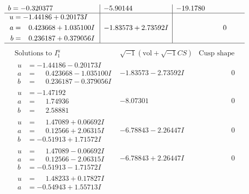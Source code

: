\documentclass[1p]{elsarticle_modified}
\theoremstyle{definition}
\newcommand{\I}{\sqrt{-1}}
\begin{document}
$$\begin{array}{c|c|c}
\begin{aligned}
b &= -0.320377\phantom{ +0.000000I}\end{aligned}
 & -5.90144\phantom{ +0.000000I} & -19.1780\phantom{ +0.000000I} \\ \hline\begin{aligned}
u &= -1.44186 + 0.20173 I \\
a &= \phantom{-}0.423668 + 1.035100 I \\
b &= \phantom{-}0.236187 + 0.379056 I\end{aligned}
 & -1.83573 + 2.73592 I & \phantom{-0.000000 } 0\\
 \hline 
 \end{array}$$\newpage$$\begin{array}{c|c|c}  
\text{Solutions to }I^u_{1}& \I (\text{vol} + \sqrt{-1}CS) & \text{Cusp shape}\\
 \hline 
\begin{aligned}
u &= -1.44186 - 0.20173 I \\
a &= \phantom{-}0.423668 - 1.035100 I \\
b &= \phantom{-}0.236187 - 0.379056 I\end{aligned}
 & -1.83573 - 2.73592 I & \phantom{-0.000000 } 0 \\ \hline\begin{aligned}
u &= -1.47192\phantom{ +0.000000I} \\
a &= \phantom{-}1.74936\phantom{ +0.000000I} \\
b &= \phantom{-}2.58881\phantom{ +0.000000I}\end{aligned}
 & -8.07301\phantom{ +0.000000I} & \phantom{-0.000000 } 0 \\ \hline\begin{aligned}
u &= \phantom{-}1.47089 + 0.06692 I \\
a &= \phantom{-}0.12566 + 2.06315 I \\
b &= -0.51913 + 1.71572 I\end{aligned}
 & -6.78843 - 2.26447 I & \phantom{-0.000000 } 0 \\ \hline\begin{aligned}
u &= \phantom{-}1.47089 - 0.06692 I \\
a &= \phantom{-}0.12566 - 2.06315 I \\
b &= -0.51913 - 1.71572 I\end{aligned}
 & -6.78843 + 2.26447 I & \phantom{-0.000000 } 0 \\ \hline\begin{aligned}
u &= \phantom{-}1.48233 + 0.17827 I \\
a &= -0.54943 + 1.55713 I \\

\end{aligned}
\end{array}$$
\end{document}
